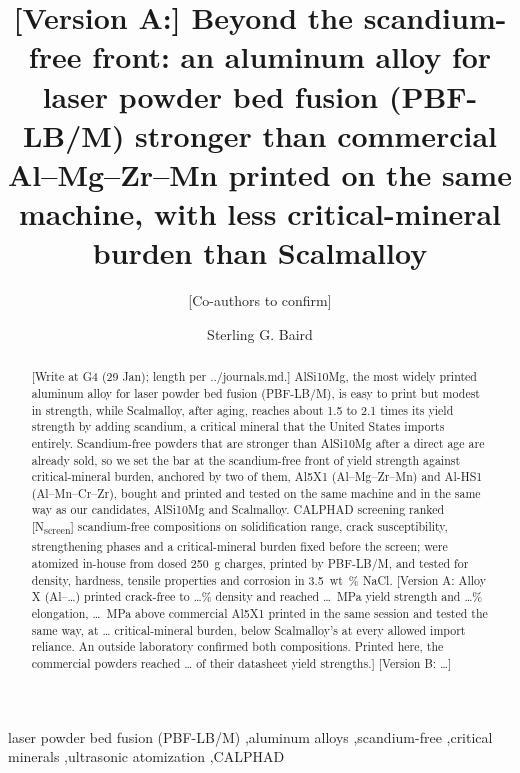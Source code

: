 \documentclass[preprint,12pt]{elsarticle}
\newcommand{\placeholder}[1]{\textcolor{red!75!black}{[#1]}}
\newcommand{\Scal}{Scalmalloy\xspace}
\newcommand{\AlSi}{AlSi10Mg\xspace}
\begin{document}
\begin{frontmatter}

\title{\placeholder{Version A:} Beyond the scandium-free front: an aluminum alloy for laser powder bed fusion (PBF-LB/M) stronger than commercial Al--Mg--Zr--Mn printed on the same machine, with less critical-mineral burden than \Scal}

\author[byu]{\placeholder{Co-authors to confirm}}
\author[byu]{Sterling G. Baird}

\begin{abstract}
\placeholder{Write at G4 (29 Jan); length per ../journals.md.}
\AlSi, the most widely printed aluminum alloy for laser powder bed fusion (PBF-LB/M), is easy to print but modest in strength, while \Scal, after aging, reaches about 1.5 to 2.1 times its yield strength by adding scandium, a critical mineral that the United States imports entirely.
Scandium-free powders that are stronger than \AlSi after a direct age are already sold, so we set the bar at the scandium-free front of yield strength against critical-mineral burden, anchored by two of them, Al5X1 (Al--Mg--Zr--Mn) and Al-HS1 (Al--Mn--Cr--Zr), bought and printed and tested on the same machine and in the same way as our candidates, \AlSi and \Scal.
CALPHAD screening ranked \placeholder{N\textsubscript{screen}} scandium-free compositions on solidification range, crack susceptibility, strengthening phases and a critical-mineral burden fixed before the screen; \NCompositions{} were atomized in-house from dosed \SI{250}{g} charges, printed by PBF-LB/M, and tested for density, hardness, tensile properties and corrosion in \SI{3.5}{wt\%} NaCl.
\placeholder{Version A: Alloy X (Al--\dots) printed crack-free to \dots\% density and reached \dots~MPa yield strength and \dots\% elongation, \dots~MPa above commercial Al5X1 printed in the same session and tested the same way, at \dots{} critical-mineral burden, below \Scal's at every allowed import reliance. An outside laboratory confirmed both compositions. Printed here, the commercial powders reached \dots{} of their datasheet yield strengths.}
\placeholder{Version B: \dots}
\end{abstract}

\begin{keyword}
laser powder bed fusion (PBF-LB/M) \sep aluminum alloys \sep scandium-free \sep critical minerals \sep ultrasonic atomization \sep CALPHAD
\end{keyword}

\end{frontmatter}
\end{document}
